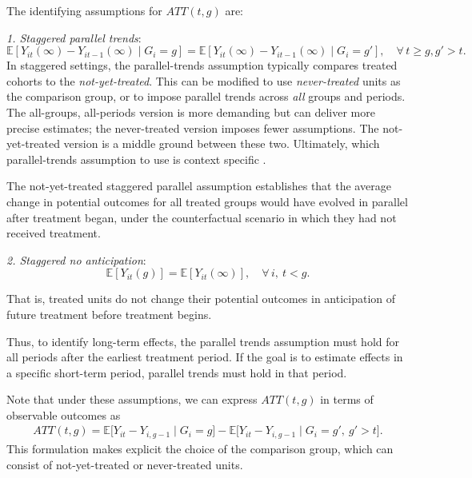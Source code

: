 The identifying assumptions for $ATT(t,g)$ are:

\textit{1. Staggered parallel trends}:
\begin{equation}
	\mathbb{E}[Y_{it}(\infty) - Y_{it-1}(\infty) \mid G_i = g] 
	= \mathbb{E}[Y_{it}(\infty) - Y_{it-1}(\infty) \mid G_i = g'], \quad \forall\, t \geq g, g'>t.
\end{equation}
In staggered settings, the parallel-trends assumption typically compares treated cohorts to the \emph{not-yet-treated}. This can be modified to use \emph{never-treated} units as the comparison group, or to impose parallel trends across \emph{all} groups and periods. The all-groups, all-periods version is more demanding but can deliver more precise estimates; the never-treated version imposes fewer assumptions. The not-yet-treated version is a middle ground between these two. Ultimately, which parallel-trends assumption to use is context specific \cite{baker2025did_guide}.


The not-yet-treated staggered parallel assumption establishes that the average change in potential outcomes for all treated groups would have evolved in parallel after treatment began, under the counterfactual scenario in which they had not received treatment.

\textit{2. Staggered no anticipation}:
\begin{equation}
	\mathbb{E}[Y_{it}(g)] = \mathbb{E}[Y_{it}(\infty)], \quad \forall\, i,\ t < g.
\end{equation}

That is, treated units do not change their potential outcomes in anticipation of future treatment before treatment begins.

Thus, to identify long-term effects, the parallel trends assumption must hold for all periods after the earliest treatment period. If the goal is to estimate effects in a specific short-term period, parallel trends must hold in that period.

Note that under these assumptions, we can express $ATT(t,g)$ in terms of observable outcomes as \cite{roth2023whats}
\begin{align*}
	ATT(t,g) 
	= \mathbb{E}\big[ Y_{it} - Y_{i, g-1} \mid G_i = g \big]
	- \mathbb{E}\big[ Y_{it} - Y_{i, g-1} \mid G_i = g', \ g' > t \big].
\end{align*}
This formulation makes explicit the choice of the comparison group, which can consist of not-yet-treated or never-treated units.

